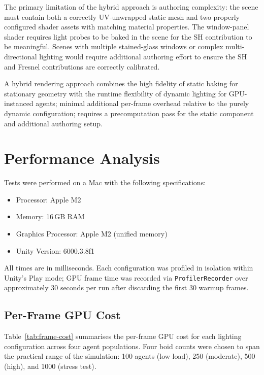 \documentclass[12pt]{article}
\begin{document}
The primary limitation of the hybrid approach is authoring complexity: the scene must contain both a correctly UV-unwrapped static mesh and two properly configured shader assets with matching material properties. The window-panel shader requires light probes to be baked in the scene for the SH contribution to be meaningful. Scenes with multiple stained-glass windows or complex multi-directional lighting would require additional authoring effort to ensure the SH and Fresnel contributions are correctly calibrated.

A hybrid rendering approach combines the high fidelity of static baking for stationary geometry with the runtime flexibility of dynamic lighting for GPU-instanced agents; minimal additional per-frame overhead relative to the purely dynamic configuration; requires a precomputation pass for the static component and additional authoring setup.

\clearpage
\section{Performance Analysis}
\label{sec:performance}

Tests were performed on a Mac with the following specifications:
\begin{itemize}
  \item Processor: Apple M2
  \item Memory: 16\,GB RAM
  \item Graphics Processor: Apple M2 (unified memory)
  \item Unity Version: 6000.3.8f1
\end{itemize}
All times are in milliseconds. Each configuration was profiled in isolation within Unity's Play mode; GPU frame time was recorded via \texttt{ProfilerRecorder} over approximately 30 seconds per run after discarding the first 30 warmup frames.

\subsection{Per-Frame GPU Cost}

Table~\ref{tab:frame-cost} summarises the per-frame GPU cost for each lighting configuration across four agent populations. Four boid counts were chosen to span the practical range of the simulation: 100 agents (low load), 250 (moderate), 500 (high), and 1000 (stress test).
\end{document}
